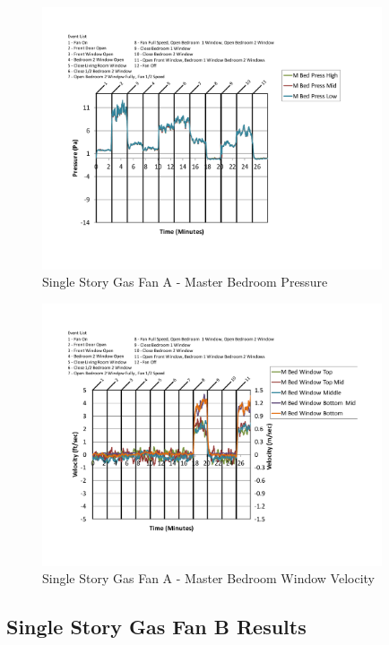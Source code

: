 \documentclass{article}
\begin{document}
\begin{appendices}
	\begin{figure}[H]
		\centering
		\includegraphics[height=3.05in,trim=0.67in 1.1in 0.67in 0.8in,clip=true]{0_Images/Results_Charts/ColdFlow/Single_Story/Gas/A/Master_Bedroom_Pressure.pdf}
		\caption{Single Story Gas Fan A - Master Bedroom Pressure}
	\end{figure}
 

	\begin{figure}[H]
		\centering
		\includegraphics[height=3.05in,trim=0.67in 1.1in 0.67in 0.8in,clip=true]{0_Images/Results_Charts/ColdFlow/Single_Story/Gas/A/Master_Bedroom_Window_Velocity.pdf}
		\caption{Single Story Gas Fan A - Master Bedroom Window Velocity}
	\end{figure}
 
	\clearpage

		\clearpage
\clearpage		\large
\subsection{Single Story Gas Fan B Results} \label{App:Single_StoryGasFanBResults} 


\end{appendices}
\end{document}

